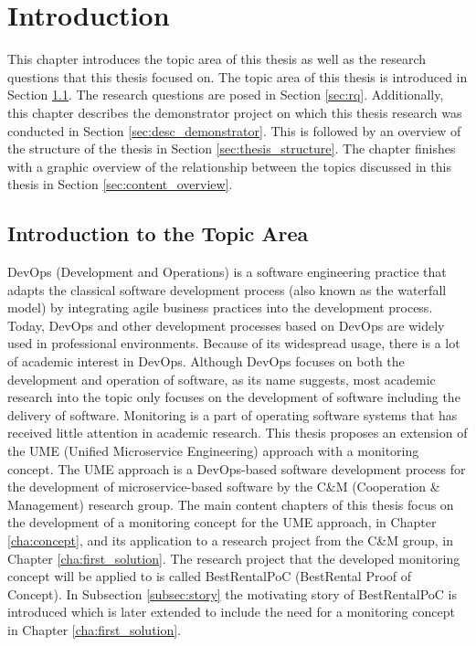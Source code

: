\chapter{Introduction}
\label{cha:introduction}

This chapter introduces the topic area of this thesis as well as the research questions
that this thesis focused on. The topic area of this thesis is introduced in Section \ref{sec:intro_topic}.
The research questions are posed in Section \ref{sec:rq}. Additionally,
this chapter describes the demonstrator project on which this thesis research
was conducted in Section \ref{sec:desc_demonstrator}. This is followed by an overview
of the structure of the thesis in Section \ref{sec:thesis_structure}. The chapter finishes
with a graphic overview of the relationship between the topics discussed in this thesis
in Section \ref{sec:content_overview}.

\section{Introduction to the Topic Area}
\label{sec:intro_topic}

DevOps (Development and Operations) is a software engineering practice that adapts the classical software development process (also known as the waterfall model)
by integrating agile business practices into the development process. Today, DevOps and other
development processes based on DevOps are widely used in professional environments. Because
of its widespread usage, there is a lot of academic interest in DevOps. Although DevOps focuses
on both the development and operation of software, as its name suggests, most academic research
into the topic only focuses on the development of software including the delivery of software.
Monitoring is a part of operating software systems that has received little attention in academic research.
This thesis proposes an extension of the UME (Unified Microservice Engineering) approach with a monitoring concept.
The UME approach is a DevOps-based software development process for the development of microservice-based
software by the C\&M (Cooperation \& Management) research group. The main content chapters of this thesis
focus on the development of a monitoring concept for the UME approach, in Chapter \ref{cha:concept},
and its application to a research project from the C\&M group, in Chapter \ref{cha:first_solution}.
The research project that the developed monitoring concept will be applied to is called
BestRentalPoC (BestRental Proof of Concept).
In Subsection \ref{subsec:story} the motivating story of BestRentalPoC is introduced which is later extended
to include the need for a monitoring concept in Chapter \ref{cha:first_solution}.


